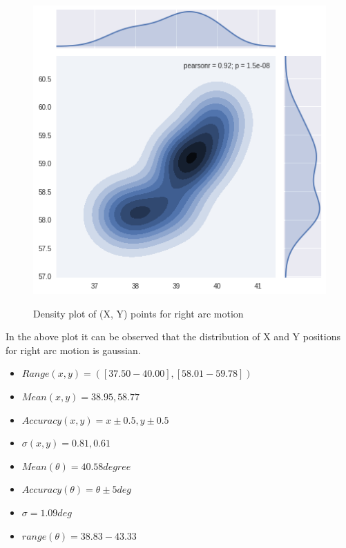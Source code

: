 \documentclass[11pt,a4paper]{article}
\begin{document}
\begin{itemize}
\begin{figure}[H]
\centering	
\includegraphics[width=0.8\linewidth]{rightG}
\label{fig:sub1}
\caption{Density plot of (X, Y) points for right arc motion}
\end{figure}

In the above plot it can be observed that the distribution of X and Y positions for right arc motion is gaussian.

\begin{itemize}
\item $ Range (x,y) =([37.50-40.00],[58.01-59.78])  $
\item $ Mean (x, y) = 38.95,58.77$
\item $ Accuracy (x,y) = x \pm0.5 , y \pm0.5  $ 
\item $ \sigma (x, y)= 0.81, 0.61 $
\item $ Mean(\theta) = 40.58 degree$
\item $ Accuracy (\theta)= \theta \pm5  deg $
\item $ \sigma = 1.09 deg$
\item $ range (\theta) = 38.83 - 43.33 $
\end{itemize}


\end{itemize}
\end{document}
